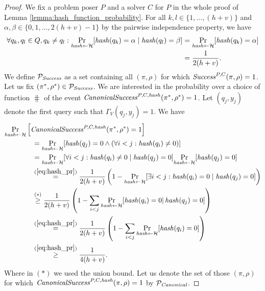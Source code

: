 \begin{proof}
We fix a problem poser $P$ and a solver $C$ for $P$ in the whole proof of Lemma \ref{lemma:hash_function_probability}.
For all $k,l \in \{1, \dotsc, (h+v)\}$ and $\alpha,\beta \in \{0,1,\dotsc,2(h+v)-1\}$ by the pairwise independence property, we have
\begin{align}
  \label{eq:hash_pr}
 \forall q_k,q_l \in Q, q_k \neq q_l : \underset{\operatorname{\mathit{hash}} \leftarrow \mathcal{H}}{\Pr}[\operatorname{\mathit{hash}}(q_k) = \alpha \mid \operatorname{\mathit{hash}}(q_l) = \beta] &=
 \underset{\operatorname{\mathit{hash}} \leftarrow \mathcal{H}}{\Pr}[\operatorname{\mathit{hash}}(q_k) = \alpha] \notag\\
 &= \frac{1}{2(h+v)}.
\end{align}
%
We define $\mathcal{P}_{\operatorname{\mathit{Success}}}$ as a set containing all $(\pi,\rho)$ for which $\operatorname{\mathit{Success}}^{P, C}(\pi, \rho) = 1$.
Let us fix $(\pi^*, \rho^*) \in \mathcal{P}_{\mathit{Success}}$. We are interested in the probability over
a choice of function $\hash$ of the event $\operatorname{\mathit{CanonicalSuccess}}^{P,C,\operatorname{\mathit{hash}}}(\pi^*, \rho^*) = 1$.
Let $(q_j, y_j)$ denote the first query such that $\Gamma_V(q_j, y_j) = 1$. We have
\begin{align}
  \label{ineq:prob_hash_success}
  &\underset{\operatorname{\mathit{hash}} \leftarrow \mathcal{H}}{\Pr}\left[\operatorname{\mathit{CanonicalSuccess}}^{P,C,\operatorname{\mathit{hash}}}(\pi^*, \rho^*) = 1\right] \notag\\
  &\mbox\qquad\qquad = \underset{\operatorname{\mathit{hash}} \leftarrow \mathcal{H}}{\Pr}[\operatorname{\mathit{hash}}(q_j) = 0 \land (\forall i < j : \operatorname{\mathit{hash}}(q_i) \neq 0)] \notag\\
  &\mbox\qquad\qquad = \underset{\operatorname{\mathit{hash}} \leftarrow \mathcal{H}}{\Pr}[
  \forall i < j : \operatorname{\mathit{hash}}(q_i) \neq 0 \mid \operatorname{\mathit{hash}}(q_j) = 0] \underset{\operatorname{\mathit{hash}} \leftarrow \mathcal{H}}{\Pr}[\operatorname{\mathit{hash}}(q_j) = 0] \notag\\
  &\mbox\qquad\qquad \stackrel{(\ref{eq:hash_pr})}{=} \frac{1}{2(h+v)}\left(1 -\underset{\operatorname{\mathit{hash}} \leftarrow \mathcal{H}}{\Pr}[\exists i < j : \operatorname{\mathit{hash}}(q_i) = 0 \mid \operatorname{\mathit{hash}}(q_j) = 0] \right) \notag\\
  &\mbox\qquad\qquad \stackrel{(*)}{\geq} \frac{1}{2(h+v)} \left( 1 - \sum_{i < j} \underset{\operatorname{\mathit{hash}} \leftarrow \mathcal{H}}{\Pr}[\operatorname{\mathit{hash}}(q_i) = 0 | \operatorname{\mathit{hash}}(q_j) = 0] \right) \notag\\
  &\mbox\qquad\qquad \stackrel{(\ref{eq:hash_pr})}{=} \frac{1}{2(h+v)} \left( 1 -  \sum_{i < j}\underset{\operatorname{\mathit{hash}} \leftarrow \mathcal{H}}{\Pr}[\operatorname{\mathit{hash}}(q_i) = 0] \right) \notag\\
  &\mbox\qquad\qquad \stackrel{(\ref{eq:hash_pr})}{\geq} \frac{1}{4(h+v)}.
\end{align}
Where in $(*)$ we used the union bound.
Let us denote the set of those $(\pi,\rho)$ for which \linebreak
 $\operatorname{\mathit{CanonicalSuccess}}^{P, C, \operatorname{\mathit{hash}}}(\pi, \rho) = 1$ by $\mathcal{P}_{\mathit{Canonical}}$.

\end{proof}
